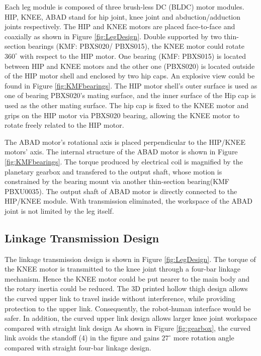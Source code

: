 Each leg module is composed of three brush-less DC (BLDC) motor modules. HIP, KNEE, ABAD stand for hip joint, knee joint and abduction/adduction joints respectively. The HIP and KNEE motors are placed face-to-face and coaxially as shown in Figure \ref{fig:LegDesign}. Double supported by two thin-section bearings (KMF: PBXS020/ PBXS015), the KNEE motor could rotate $360^{\circ}$ with respect to the HIP motor. One bearing (KMF: PBXS015) is located between HIP and KNEE motors and the other one (PBXS020) is located outside of the HIP motor shell and enclosed by two hip caps. An explosive view could be found in Figure \ref{fig:KMFbearings}. The HIP motor shell's outer surface is used as one of bearing PBXS020's mating surface, and the inner surface of the Hip cap is used as the other mating surface. The hip cap is fixed to the KNEE motor and grips on the HIP motor via PBXS020 bearing, allowing the KNEE motor to rotate freely related to the HIP motor.

The ABAD motor's rotational axis is placed perpendicular to the HIP/KNEE motors' axis. The internal structure of the ABAD motor is shown in Figure \ref{fig:KMFbearings}. The torque produced by electrical coil is magnified by the planetary gearbox and transfered to the output shaft, whose motion is constrained by the bearing mount via another thin-section bearing(KMF PBXU0035). The output shaft of ABAD motor is directly connected to the HIP/KNEE module. With transmission eliminated, the workspace of the ABAD joint is not limited by the leg itself. 

\subsection{\textbf{Linkage Transmission Design}}
\label{sec:legDesign}

The linkage transmission design is shown in Figure \ref{fig:LegDesign}. The torque of the KNEE motor is transmitted to the knee joint through a four-bar linkage mechanism. Hence the KNEE motor could be put nearer to the main body and the rotary inertia could be reduced. The 3D printed hollow thigh design allows the curved upper link to travel inside without interference, while providing protection to the upper link. Consequently, the robot-human interface would be safer. In addition, the curved upper link design allows larger knee joint workspace compared with straight link design As shown in Figure \ref{fig:gearbox}, the curved link avoids the standoff (4) in the figure and gains $27^{\circ}$ more rotation angle compared with straight four-bar linkage design.

